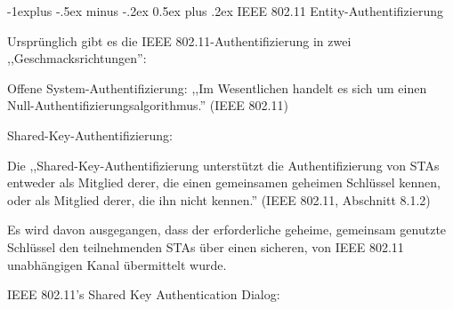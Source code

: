 \documentclass[a4paper]{article}
\makeatletter
\renewcommand{\subsection}{\@startsection{subsection}{2}{0mm}%
 {-1explus -.5ex minus -.2ex}%
 {0.5ex plus .2ex}%
 {\normalfont\normalsize\bfseries}}
\makeatother
\begin{document}
\begin{multicols}{3}
      \subsection{IEEE 802.11
            Entity-Authentifizierung}

      \begin{itemize*}
            \item Ursprünglich gibt es die IEEE 802.11-Authentifizierung in zwei
            ,,Geschmacksrichtungen'':
            \begin{itemize*}
                  \item Offene System-Authentifizierung: ,,Im Wesentlichen handelt es sich um einen Null-Authentifizierungsalgorithmus.'' (IEEE 802.11)
                  \item Shared-Key-Authentifizierung:
                  \begin{itemize*} \item Die ,,Shared-Key-Authentifizierung unterstützt die Authentifizierung von STAs entweder als Mitglied derer, die einen gemeinsamen geheimen Schlüssel kennen, oder als Mitglied derer, die ihn nicht kennen.'' (IEEE 802.11, Abschnitt 8.1.2) \item Es wird davon ausgegangen, dass der erforderliche geheime, gemeinsam genutzte Schlüssel den teilnehmenden STAs über einen sicheren, von IEEE 802.11 unabhängigen Kanal übermittelt wurde. \end{itemize*}
            \end{itemize*}
      \end{itemize*}

      IEEE 802.11's Shared Key Authentication Dialog:


\end{multicols}
\end{document}

